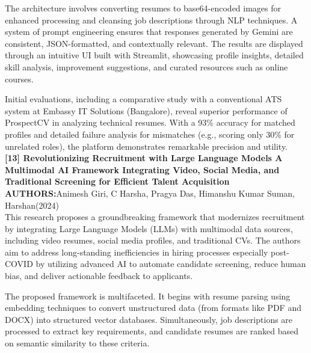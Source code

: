\documentclass[a4paper, 12pt]{report}
\begin{document}
The architecture involves converting resumes to base64-encoded images for enhanced processing and cleansing job descriptions through NLP techniques. A system of prompt engineering ensures that responses generated by Gemini are consistent, JSON-formatted, and contextually relevant. The results are displayed through an intuitive UI built with Streamlit, showcasing profile insights, detailed skill analysis, improvement suggestions, and curated resources such as online courses.

Initial evaluations, including a comparative study with a conventional ATS system at Embassy IT Solutions (Bangalore), reveal superior performance of ProspectCV in analyzing technical resumes. With a 93\% accuracy for matched profiles and detailed failure analysis for mismatches (e.g., scoring only 30\% for unrelated roles), the platform demonstrates remarkable precision and utility.\\
\noindent\textbf{[13] Revolutionizing Recruitment with Large Language Models A Multimodal AI Framework Integrating Video, Social Media, and Traditional Screening for Efficient Talent Acquisition}\\
\textbf{AUTHORS:}Animesh Giri, C Harsha, Pragya Das, Himanshu Kumar Suman, Harshan(2024)\\
This research proposes a groundbreaking framework that modernizes recruitment by integrating Large Language Models (LLMs) with multimodal data sources, including video resumes, social media profiles, and traditional CVs. The authors aim to address long-standing inefficiencies in hiring processes especially post-COVID by utilizing advanced AI to automate candidate screening, reduce human bias, and deliver actionable feedback to applicants.

The proposed framework is multifaceted. It begins with resume parsing using embedding techniques to convert unstructured data (from formats like PDF and DOCX) into structured vector databases. Simultaneously, job descriptions are processed to extract key requirements, and candidate resumes are ranked based on semantic similarity to these criteria.
\end{document}
